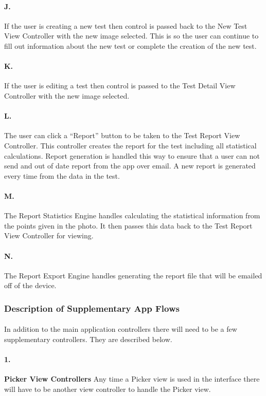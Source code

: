 \paragraph{J.} If the user is creating a new test then control is passed back to the New Test View Controller with the new image selected. This is so the user can continue to fill out information about the new test or complete the creation of the new test.
\paragraph{K.} If the user is editing a test then control is passed to the Test Detail View Controller with the new image selected.
\paragraph{L.} The user can click a ``Report'' button to be taken to the Test Report View Controller. This controller creates the report for the test including all statistical calculations. Report generation is handled this way to ensure that a user can not send and out of date report from the app over email. A new report is generated every time from the data in the test. 
\paragraph{M.} The Report Statistics Engine handles calculating the statistical information from the points given in the photo. It then passes this data back to the Test Report View Controller for viewing.
\paragraph{N.} The Report Export Engine handles generating the report file that will be emailed off of the device. 

\subsubsection{Description of Supplementary App Flows}
\paragraph{} In addition to the main application controllers there will need to be a few supplementary controllers. They are described below.
\paragraph{1.} \textbf{Picker View Controllers} Any time a Picker view is used in the interface there will have to be another view controller to handle the Picker view. 

